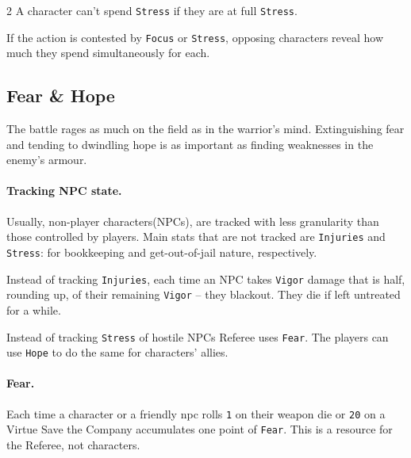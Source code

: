 \begin{multicols*}{2}
A character can't spend \texttt{Stress} if they are at full \texttt{Stress}. 

If the action is contested by \texttt{Focus} or \texttt{Stress}, opposing characters reveal how much they spend simultaneously for each. 

\newcolumn

\subsection*{Fear \& Hope}

\label{sec:hopefear}
The battle rages as much on the field as in the warrior's mind. 
Extinguishing fear and tending to dwindling hope is as important as finding weaknesses in the enemy's armour. 

\paragraph{Tracking NPC state.} Usually, non-player characters(NPCs), are tracked with less granularity than those controlled by players. 
Main stats that are not tracked are \texttt{Injuries} and \texttt{Stress}: for bookkeeping and get-out-of-jail nature, respectively. 

Instead of tracking \texttt{Injuries}, each time an NPC takes \texttt{Vigor} damage that is half, rounding up, of their remaining \texttt{Vigor} -- they blackout. 
They die if left untreated for a while.

Instead of tracking \texttt{Stress} of hostile NPCs Referee uses \texttt{Fear}. The players can use \texttt{Hope} to do the same for characters' allies.

\paragraph{Fear.} Each time a character or a friendly npc rolls \texttt{1} on their weapon die or \texttt{20} on a Virtue Save the Company accumulates one point of \texttt{Fear}. 
This is a resource for the Referee, not characters.


\end{multicols*}
